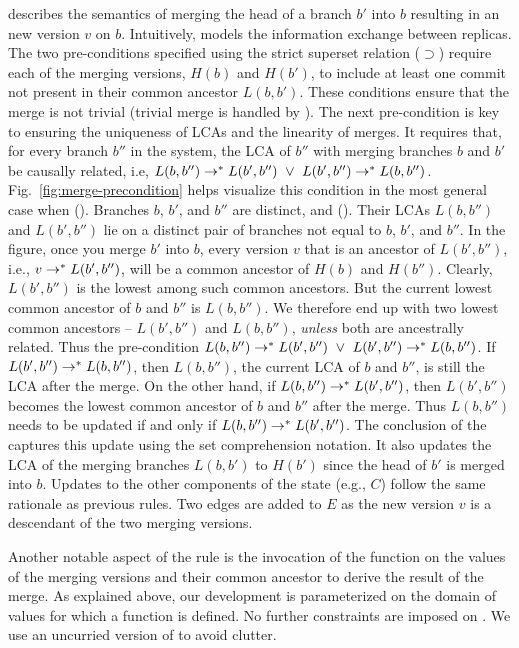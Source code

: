  describes the semantics of merging the head of a
branch $b'$ into $b$ resulting in an new version $v$ on $b$.
Intuitively,  models the information exchange between
replicas. The two pre-conditions specified using the strict superset
relation ($\supset$) require each of the merging versions, $H(b)$ and
$H(b')$, to include at least one commit not present in their common
ancestor $L(b,b')$. These conditions ensure that the merge is not
trivial (trivial merge is handled by ). The next
pre-condition is key to ensuring the uniqueness of LCAs and the
linearity of merges. It requires that, for every branch $b''$ in the
system, the LCA of $b''$ with merging branches $b$ and $b'$ be
causally related, i.e, $L(b,b'') \rightarrow^{*} L(b',b'') ~\vee~ L(b',b'')
\rightarrow^{*} L(b,b'')$. Fig.~\ref{fig:merge-precondition} helps visualize
this condition in the most general case when (). Branches $b$,
$b'$, and $b''$ are distinct, and (). Their LCAs $L(b,b'')$ and
$L(b',b'')$ lie on a distinct pair of branches not equal to $b$, $b'$,
and $b''$. In the figure, once you merge $b'$ into $b$, every version
$v$ that is an ancestor of $L(b',b'')$, i.e., $v \rightarrow^{*} L(b',b'')$,
will be  a common ancestor of $H(b)$ and $H(b'')$. Clearly,
$L(b',b'')$ is the lowest among such common ancestors. But the current
lowest common ancestor of $b$ and $b''$ is $L(b,b'')$. We therefore
end up with two lowest common ancestors -- $L(b',b'')$ and $L(b,b'')$,
\emph{unless} both are ancestrally related. Thus the pre-condition
$L(b,b'') \rightarrow^{*} L(b',b'') ~\vee~ L(b',b'') \rightarrow^{*} L(b,b'')$. If
$L(b',b'') \rightarrow^{*} L(b,b'')$, then $L(b,b'')$, the current LCA of $b$
and $b''$, is still the LCA after the merge. On the other hand, if
$L(b,b'') \rightarrow^{*} L(b',b'')$, then $L(b',b'')$ becomes the lowest
common ancestor of $b$ and $b''$ after the merge. Thus $L(b,b'')$
needs to be updated if and only if $L(b,b'') \rightarrow^{*} L(b',b'')$. The
conclusion of the  captures this update using the set
comprehension notation. It also updates the LCA of the merging
branches $L(b,b')$ to $H(b')$ since the head of $b'$ is merged into
$b$. Updates to the other components of the state (e.g., $C$) follow
the same rationale as previous rules. Two edges are added to $E$ as
the new version $v$ is a descendant of the two merging versions.

Another notable aspect of the  rule is the invocation
of the  function on the values of the  merging versions and
their common ancestor to derive the result of the merge. As explained
above, our development is parameterized on the domain of values for
which a  function is defined. No further constraints are
imposed on . We use an uncurried version of  to
avoid clutter.


